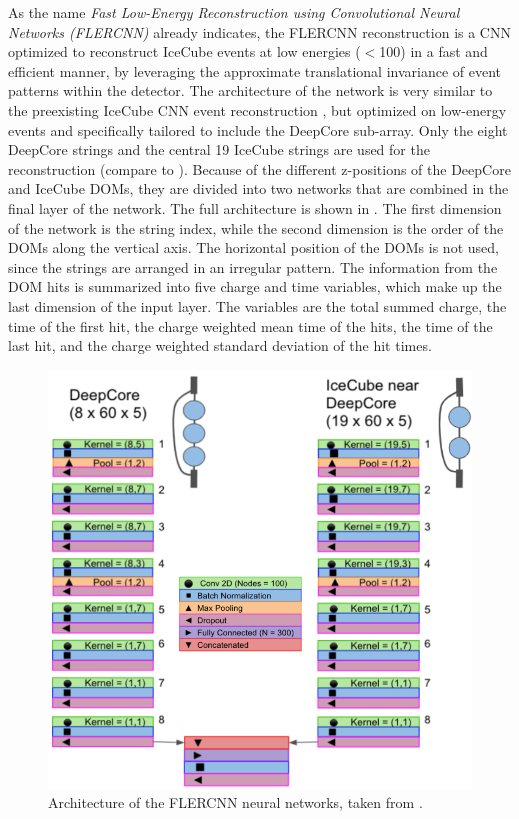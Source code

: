 As the name \textit{Fast Low-Energy Reconstruction using Convolutional Neural Networks (FLERCNN)} already indicates, the FLERCNN reconstruction  \cite{flercnn}is a CNN optimized to reconstruct IceCube events at low energies ($<$\SI{100}{\gev}) in a fast and efficient manner, by leveraging the approximate translational invariance of event patterns within the detector. The architecture of the network is very similar to the preexisting IceCube CNN event reconstruction , but optimized on low-energy events and specifically tailored to include the DeepCore sub-array. Only the eight DeepCore strings and the central 19 IceCube strings are used for the reconstruction (compare to ). Because of the different z-positions of the DeepCore and IceCube DOMs, they are divided into two networks that are combined in the final layer of the network. The full architecture is shown in . The first dimension of the network is the string index, while the second dimension is the order of the DOMs along the vertical axis. The horizontal position of the DOMs is not used, since the strings are arranged in an irregular pattern. The information from the DOM hits is summarized into five charge and time variables, which make up the last dimension of the input layer. The variables are the total summed charge, the time of the first hit, the charge weighted mean time of the hits, the time of the last hit, and the charge weighted standard deviation of the hit times.

\begin{figure}
    \includegraphics{figures/simulation_and_processing/flercnn/Detailed_CNN_Architecture_combined.png}
	\caption[FLERCNN architecture]{Architecture of the FLERCNN neural networks, taken from \cite{flercnn_proceedings}.}
\end{figure}

